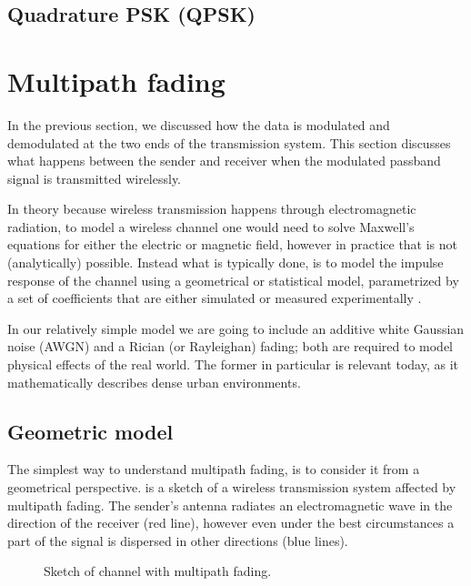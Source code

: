 \subsection{Quadrature PSK (QPSK)}


\section{Multipath fading} \label{sec:multipath-fading}

In the previous section, we discussed how the data is modulated and demodulated at the two ends of the transmission system. This section discusses what happens between the sender and receiver when the modulated passband signal is transmitted wirelessly.

In theory because wireless transmission happens through electromagnetic radiation, to model a wireless channel one would need to solve Maxwell's equations for either the electric or magnetic field, however in practice that is not (analytically) possible. Instead what is typically done, is to model the impulse response of the channel using a geometrical or statistical model, parametrized by a set of coefficients that are either simulated or measured experimentally \cite{Gallager}.

In our relatively simple model we are going to include an additive white Gaussian noise (AWGN) and a Rician (or Rayleighan) fading; both are required to model physical effects of the real world. The former in particular is relevant today, as it mathematically describes dense urban environments.

\subsection{Geometric model}

The simplest way to understand multipath fading, is to consider it from a geometrical perspective.  is a sketch of a wireless transmission system affected by multipath fading. The sender's antenna radiates an electromagnetic wave in the direction of the receiver (red line), however even under the best circumstances a part of the signal is dispersed in other directions (blue lines).

\begin{figure}
	\centering
	
	\caption{
		Sketch of channel with multipath fading.
		\label{fig:multipath-sketch}
	}
\end{figure}

